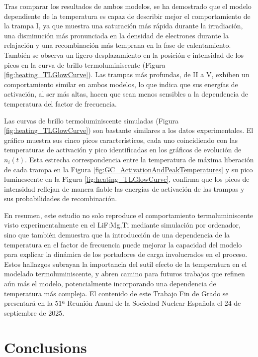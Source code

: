 Tras comparar los resultados de ambos modelos, se ha demostrado que el modelo dependiente de la temperatura es capaz de describir mejor el comportamiento de la trampa I, ya que muestra una saturación más rápida durante la irradiación, una disminución más pronunciada en la densidad de electrones durante la relajación y una recombinación más temprana en la fase de calentamiento. También se observa un ligero desplazamiento en la posición e intensidad de los picos en la curva de brillo termoluminiscente (Figura \ref{fig:heating_TLGlowCurve}). Las trampas más profundas, de II a V, exhiben un comportamiento similar en ambos modelos, lo que indica que sus energías de activación, al ser más altas, hacen que sean menos sensibles a la dependencia de temperatura del factor de frecuencia.

\vspace{10pt}

Las curvas de brillo termoluminiscente simuladas (Figura \ref{fig:heating_TLGlowCurve}) son bastante similares a los datos experimentales. El gráfico muestra sus cinco picos característicos, cada uno coincidiendo con las temperaturas de activación y pico identificadas en los gráficos de evolución de $n_i(t)$. Esta estrecha correspondencia entre la temperatura de máxima liberación de cada trampa en la Figura \ref{fig:GC_ActivationAndPeakTemperatures} y su pico luminescente en la Figura \ref{fig:heating_TLGlowCurve}, confirma que los picos de intensidad reflejan de manera fiable las energías de activación de las trampas y sus probabilidades de recombinación.

\vspace{10pt}

En resumen, este estudio no solo reproduce el comportamiento termoluminiscente visto experimentalmente en el LiF:Mg,Ti mediante simulación por ordenador, sino que también demuestra que la introducción de una dependencia de la temperatura en el factor de frecuencia puede mejorar la capacidad del modelo para explicar la dinámica de los portadores de carga involucrados en el proceso. Estos hallazgos subrayan la importancia del sutil efecto de la temperatura en el modelado termoluminiscente, y abren camino para futuros trabajos que refinen aún más el modelo, potencialmente incorporando una dependencia de temperatura más compleja. El contenido de este Trabajo Fin de Grado se presentará en la 51ª Reunión Anual de la Sociedad Nuclear Española el 24 de septiembre de 2025.


\chapter*{Conclusions}

